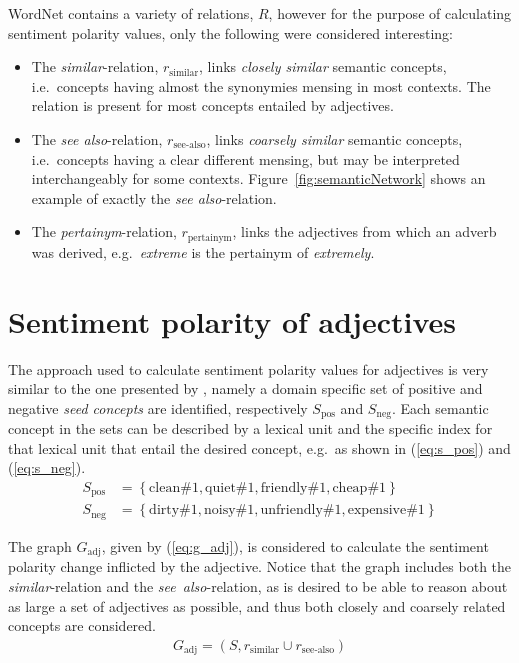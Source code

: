 WordNet contains a variety of relations, $R$, however for the purpose of calculating sentiment polarity values, only the following were considered interesting:
\begin{itemize}
	\item The \emph{similar}-relation, $r_\mathrm{similar}$, links \emph{closely similar} semantic concepts, i.e.\ concepts having almost the synonymies mensing in most contexts. The relation is present for most concepts entailed by adjectives.
	\item The \emph{see also}-relation, $r_\mathrm{see\text{-}also}$, links \emph{coarsely similar} semantic concepts, i.e.\ concepts having a clear different mensing, but may be interpreted interchangeably for some contexts. Figure~\vref{fig:semanticNetwork} shows an example of exactly the \emph{see also}-relation.
	\item The \emph{pertainym}-relation, $r_\mathrm{pertainym}$, links the adjectives from which an adverb was derived, e.g.\ \emph{extreme} is the pertainym of \emph{extremely}.
\end{itemize}
\vspace{1em}

\section{Sentiment polarity of adjectives}
\label{sec:sentimentAdj}
The approach used to calculate sentiment polarity values for adjectives is very similar to the one presented by \citeauthor{valenceShifting} , namely a domain specific set of positive and negative \emph{seed concepts} are identified, respectively $S_\mathrm{pos}$ and $S_\mathrm{neg}$. Each semantic concept in the sets can be described by a lexical unit and the specific index for that lexical unit that entail the desired concept, e.g.\ as shown in (\ref{eq:s_pos}) and (\ref{eq:s_neg}).
\begin{align}
	S_\mathrm{pos} &= \left\{ \text{clean}\#1, \text{quiet}\#1, \text{friendly}\#1, \text{cheap}\#1 \right\} \label{eq:s_pos}\\
	S_\mathrm{neg} &= \left\{ \text{dirty}\#1, \text{noisy}\#1, \text{unfriendly}\#1, \text{expensive}\#1 \right\} \label{eq:s_neg}
\end{align}

The graph $G_\mathrm{adj}$, given by (\ref{eq:g_adj}), is considered to calculate the sentiment polarity change inflicted by the adjective. Notice that the graph includes both the \emph{similar}-relation and the \emph{see\ also}-relation, as is desired to be able to reason about as large a set of adjectives as possible, and thus both closely and coarsely related concepts are considered.
\begin{align}
	G_\mathrm{adj} = (S, r_\mathrm{similar} \cup r_\mathrm{see\text{-}also})
	\label{eq:g_adj}
\end{align}
 
